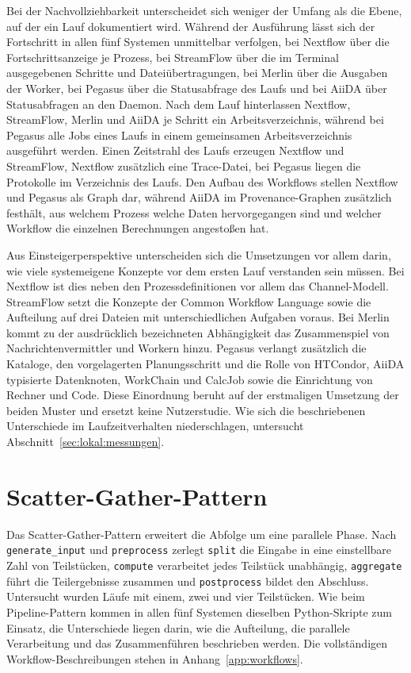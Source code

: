 Bei der Nachvollziehbarkeit unterscheidet sich weniger der Umfang
als die Ebene, auf der ein Lauf dokumentiert wird. Während der
Ausführung lässt sich der Fortschritt in allen fünf Systemen
unmittelbar verfolgen, bei Nextflow über die Fortschrittsanzeige je
Prozess, bei StreamFlow über die im Terminal ausgegebenen Schritte
und Dateiübertragungen, bei Merlin über die Ausgaben der Worker, bei
Pegasus über die Statusabfrage des Laufs und bei AiiDA über
Statusabfragen an den Daemon. Nach dem Lauf hinterlassen Nextflow,
StreamFlow, Merlin und AiiDA je Schritt ein Arbeitsverzeichnis,
während bei Pegasus alle Jobs eines Laufs in einem gemeinsamen
Arbeitsverzeichnis ausgeführt werden. Einen Zeitstrahl des Laufs
erzeugen Nextflow und StreamFlow, Nextflow zusätzlich eine
Trace-Datei, bei Pegasus liegen die Protokolle im Verzeichnis des
Laufs. Den Aufbau des Workflows stellen Nextflow und Pegasus als
Graph dar, während AiiDA im Provenance-Graphen zusätzlich festhält,
aus welchem Prozess welche Daten hervorgegangen sind und welcher
Workflow die einzelnen Berechnungen angestoßen hat.

Aus Einsteigerperspektive unterscheiden sich die Umsetzungen vor
allem darin, wie viele systemeigene Konzepte vor dem ersten Lauf
verstanden sein müssen. Bei Nextflow ist dies neben den
Prozessdefinitionen vor allem das Channel-Modell. StreamFlow setzt
die Konzepte der Common Workflow Language sowie die Aufteilung auf
drei Dateien mit unterschiedlichen Aufgaben voraus. Bei Merlin kommt
zu der ausdrücklich bezeichneten Abhängigkeit das Zusammenspiel von
Nachrichtenvermittler und Workern hinzu. Pegasus verlangt zusätzlich
die Kataloge, den vorgelagerten Planungsschritt und die Rolle von
HTCondor, AiiDA typisierte Datenknoten, WorkChain und CalcJob sowie
die Einrichtung von Rechner und Code. Diese Einordnung beruht auf der
erstmaligen Umsetzung der beiden Muster und ersetzt keine
Nutzerstudie. Wie sich die beschriebenen Unterschiede im
Laufzeitverhalten niederschlagen, untersucht
Abschnitt~\ref{sec:lokal:messungen}.

\section{Scatter-Gather-Pattern}
\label{sec:lokal:scattergather}

Das Scatter-Gather-Pattern erweitert die Abfolge um eine parallele
Phase. Nach \texttt{generate\_input} und \texttt{preprocess} zerlegt
\texttt{split} die Eingabe in eine einstellbare Zahl von Teilstücken,
\texttt{compute} verarbeitet jedes Teilstück unabhängig,
\texttt{aggregate} führt die Teilergebnisse zusammen und
\texttt{postprocess} bildet den Abschluss. Untersucht wurden Läufe mit
einem, zwei und vier Teilstücken. Wie beim Pipeline-Pattern kommen in
allen fünf Systemen dieselben Python-Skripte zum Einsatz, die
Unterschiede liegen darin, wie die Aufteilung, die parallele
Verarbeitung und das Zusammenführen beschrieben werden. Die
vollständigen Workflow-Beschreibungen stehen in
Anhang~\ref{app:workflows}.


